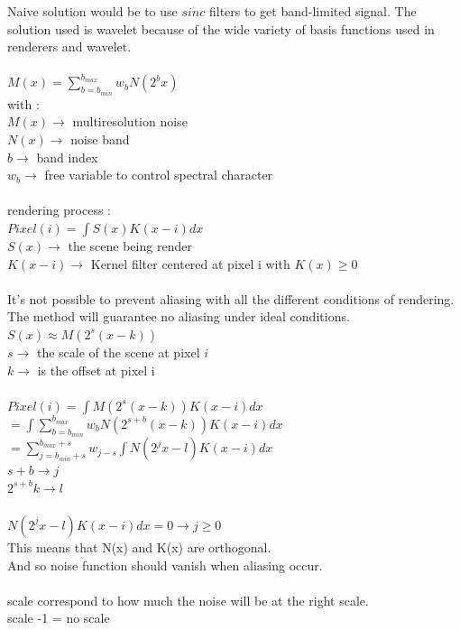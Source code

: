 \documentclass[11pt,a4paper]{article}
\begin{document}
Naive solution would be to use $sinc$ filters to get band-limited signal.
The solution used is wavelet because of the wide variety of basis functions used in renderers and wavelet.
\\\\
$M(x) = \sum\limits_{b=b_{min}}^{b_{max}} w_{b}N(2^{b}x)$
\\
with :
\\
$M(x)\rightarrow$  multiresolution noise
\\
$N(x)\rightarrow$ noise band
\\
$b\rightarrow$ band index
\\
$w_{b}\rightarrow$ free variable to control spectral character
\\
\\
rendering process :
\\
$Pixel(i) = \int S(x)K(x-i)dx$
\\
$S(x)\rightarrow$ the scene being render
\\
$K(x-i)\rightarrow$ Kernel filter centered at pixel i with $K(x) \geq 0$ 
\\
\\
It's not possible to prevent aliasing with all the different conditions of rendering. The method will guarantee no aliasing under ideal conditions.
\\
$S(x)\approx M(2^s(x-k))$
\\
$s\rightarrow$ the scale of the scene at pixel $i$
\\
$k\rightarrow$ is the offset at pixel i
\\\\
$Pixel(i) = \int M(2^s(x-k))K(x-i)dx $ 
\\
$ = \int\sum\limits_{b=b_{min}}^{b_{max}} w_{b}N(2^{s+b}(x-k))K(x-i)dx$
\\
$ = \sum\limits_{j=b_{min}+s}^{b_{max}+s} w_{j-s} \int N(2^{j}x-l)K(x-i)dx $
\\
$s+b\rightarrow j$
\\
$2^{s+b}k\rightarrow l$
\\\\
$N(2^{j}x-l)K(x-i)dx = 0 \rightarrow j\geq0 $
\\
This means that N(x) and K(x) are orthogonal.
\\
And so noise function should vanish when aliasing occur.
\\\\
scale correspond to how much the noise will be at the right scale.
\\
scale -1 = no scale\\
\end{document}
